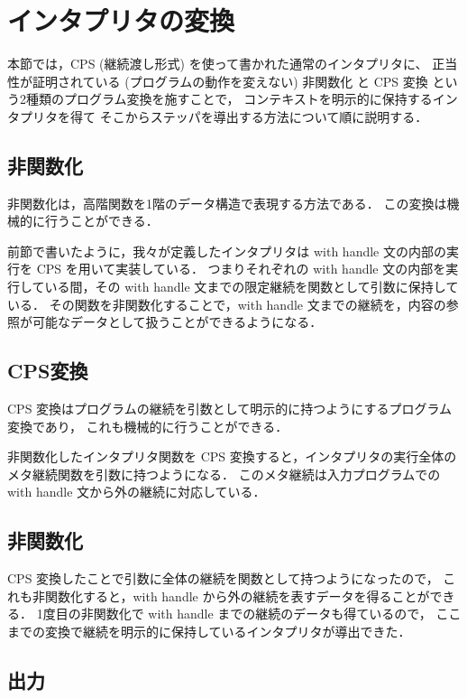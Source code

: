 \section{インタプリタの変換}
\label{section:transform}

本節では，CPS (継続渡し形式) を使って書かれた通常のインタプリタに、
正当性が証明されている (プログラムの動作を変えない)
非関数化 \cite{Reynolds1998} と CPS 変換 \cite{PLOTKIN1975125} という2種類のプログラム変換を施すことで，
コンテキストを明示的に保持するインタプリタを得て
そこからステッパを導出する方法について順に説明する．

\subsection{非関数化}
\label{subsection:defun}

非関数化は，高階関数を1階のデータ構造で表現する方法である．
この変換は機械的に行うことができる．

前節で書いたように，我々が定義したインタプリタは with handle 文の内部の実行を CPS を用いて実装している．
つまりそれぞれの with handle 文の内部を実行している間，その with handle 文までの限定継続を関数として引数に保持している．
その関数を非関数化することで，with handle 文までの継続を，内容の参照が可能なデータとして扱うことができるようになる．

\subsection{CPS変換}
\label{subsection:cps}

CPS 変換はプログラムの継続を引数として明示的に持つようにするプログラム変換であり，
これも機械的に行うことができる．

非関数化したインタプリタ関数を CPS 変換すると，インタプリタの実行全体のメタ継続関数を引数に持つようになる．
このメタ継続は入力プログラムでの with handle 文から外の継続に対応している．

\subsection{非関数化}
\label{subsection:defun2}

CPS 変換したことで引数に全体の継続を関数として持つようになったので，
これも非関数化すると，with handle から外の継続を表すデータを得ることができる．
1度目の非関数化で with handle までの継続のデータも得ているので，
ここまでの変換で継続を明示的に保持しているインタプリタが導出できた．

\subsection{出力}
\label{subsection:output}


